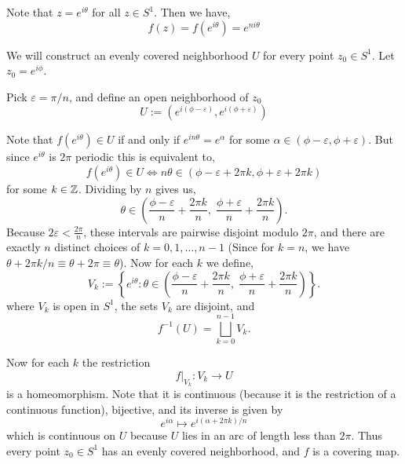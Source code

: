\documentclass[12pt]{article}
\begin{document}
\begin{solution}
    \bbni

    Note that $z = e^{i \theta}$ for all $z \in S^1$. Then we have, 
    \[f(z) = f(e^{i\theta}) = e^{n i \theta}\]

    We will construct an evenly covered neighborhood $U$ for every point $z_0 \in S^1$. Let $z_0  = e^{i\phi}$.  

    Pick $\varepsilon = \pi/n$, and define an open neighborhood of $z_0$
    \[U := (e^{i(\phi - \varepsilon)}, e^{i(\phi+\varepsilon)})\]
    
    Note that $f(e^{i\theta}) \in U$ if and only if $e^{in \theta} = e^\alpha$ for some $\alpha \in  (\phi - \varepsilon, \phi + \varepsilon)$. 
    But since $e^{i\theta}$ is $2 \pi$ periodic this is equivalent to, 
    \[f(e^{i\theta}) \in U \iff  n\theta \in  (\phi - \varepsilon + 2\pi k, \phi + \varepsilon + 2 \pi k)\]
    for some $k \in \mathbb Z$. Dividing by $n$ gives us,
    \[
    \theta \in \left(\frac{\phi - \varepsilon}{n} + \frac{2\pi k}{n},\;
    \frac{\phi + \varepsilon}{n} + \frac{2\pi k}{n}\right).
    \]
    Because $2\varepsilon < \frac{2\pi}{n}$, these intervals are pairwise disjoint modulo $2\pi$, and there are exactly $n$ distinct choices of $k = 0,1,\dots,n-1$ (Since for $k =n$, we have $\theta + 2\pi k / n \equiv \theta + 2\pi \equiv \theta$).
    Now for each $k$ we define, 
    \[
    V_k := \left\{ e^{i\theta} : \theta \in \left(\frac{\phi - \varepsilon}{n} + \frac{2\pi k}{n},\;
    \frac{\phi + \varepsilon}{n} + \frac{2\pi k}{n}\right) \right\}.
    \]
    where $V_k$ is open in $S^1$, the sets $V_k$ are disjoint, and
    \[
    f^{-1}(U) = \bigsqcup_{k=0}^{n-1} V_k.
    \]

    Now for each $k$ the restriction
    \[
    f|_{V_k} : V_k \to U
    \]
    is a homeomorphism. Note that it is continuous (because it is the restriction of a continuous function), bijective, and its inverse is given by
    \[
    e^{i\alpha} \mapsto e^{i(\alpha + 2\pi k)/n}
    \]
    which is continuous on $U$ because $U$ lies in an arc of length less than $2\pi$. 
    Thus every point $z_0 \in S^1$ has an evenly covered neighborhood, and $f$ is a covering map.
\end{solution}
\end{document}
